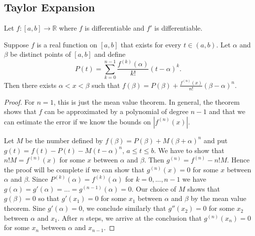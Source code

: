 \documentclass{article}
\newcommand{\R}{\mathbb{R}}
\newcommand{\ra}[1][]{\xrightarrow{#1}}
\begin{document}
\subsection{Taylor Expansion}
Let $f:[a,b]\ra\R$ where $f$ is differentiable and $f'$ is differentiable.
\begin{definition}
Suppose $f$ is a real function on $[a,b]$ that exists for every $t\in(a,b)$. Let $\alpha$ and $\beta$ be distinct points of $[a,b]$ and define $$P(t)=\sum_{k=0}^{n-1}\frac{f^{(k)}(\alpha)}{k!}(t-\alpha)^k.$$ Then there exists $\alpha<x<\beta$ such that $f(\beta)=P(\beta)+\frac{f^{(n)}(x)}{n!}(\beta-\alpha)^n$.
\end{definition}
\begin{proof}
For $n=1$, this is just the mean value theorem. In general, the theorem shows that $f$ can be approximated by a polynomial of degree $n-1$ and that we can estimate the error if we know the bounds on $|f^{(n)}(x)|$.

Let $M$ be the number defined by $f(\beta)=P(\beta)+M(\beta+\alpha)^n$ and put $g(t)=f(t)-P(t)-M(t-\alpha)^n$, $a\leq t\leq b$. We have to show that $n!M=f^{(n)}(x)$ for some $x$ between $\alpha$ and $\beta$. Then $g^{(n)}=f^{(n)}-n!M$. Hence the proof will be complete if we can show that $g^{(n)}(x)=0$ for some $x$ between $\alpha$ and $\beta$. Since $P^{(k)}(\alpha)=f^{(k)}(\alpha)$ for $k=0,...,n-1$ we have $g(\alpha)=g'(\alpha)=...=g^{(n-1)}(\alpha)=0$. Our choice of $M$ shows that $g(\beta)=0$ so that $g'(x_1)=0$ for some $x_1$ between $\alpha$ and $\beta$ by the mean value theorem. Sine $g'(\alpha)=0$, we conclude similarly that $g''(x_2)=0$ for some $x_2$ between $\alpha$ and $x_1$. After $n$ steps, we arrive at the conclusion that $g^{(n)}(x_n)=0$ for some $x_n$ between $\alpha$ and $x_{n-1}$.
\end{proof}
\end{document}
